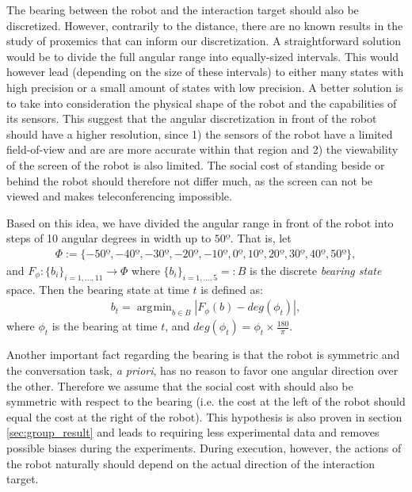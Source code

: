 \documentclass[a4paper,11pt]{report}
\DeclareMathOperator*{\argmin}{\arg\!\min}
\begin{document}
The bearing between the robot and the interaction target should also be discretized. However, contrarily to the distance, there are no known results in the study of proxemics that can inform our discretization. A straightforward solution would be to divide the full angular range into equally-sized intervals. This would however lead (depending on the size of these intervals) to either many states with high precision or a small amount of states with low precision. A better solution is to take into consideration the physical shape of the robot and the capabilities of its sensors. This suggest that the angular discretization in front of the robot should have a higher resolution, since 1) the sensors of the robot have a limited field-of-view and are are more accurate within that region and 2) the viewability of the screen of the robot is also limited. The social cost of standing beside or behind the robot should therefore not differ much, as the screen can not be viewed and makes teleconferencing impossible.

Based on this idea, we have divided the angular range in front of the robot into steps of 10 angular degrees in width up to $50º$. That is, let
\begin{align*}
  \Phi:=\{-50º,-40º,-30º,-20º,-10º,0º,10º,20º,30º,40º,50º\},
\end{align*}
and $F_\phi:\{b_i\}_{i=1,\ldots,11}\rightarrow \Phi$ where $\{b_i\}_{i=1,\ldots,5}=:B$ is the discrete \emph{bearing state} space. Then the bearing state at time $t$ is defined as:
\begin{align*}
  b_t = \argmin_{b\in B}|F_\phi(b) - deg(\phi_t)|,
\end{align*}
where $\phi_t$ is the bearing at time $t$, and $deg(\phi_t)=\phi_t\times\frac{180}{\pi}$.

Another important fact regarding the bearing is that the robot is symmetric and the conversation task, \emph{a priori}, has no reason to favor one angular direction over the other. Therefore we assume that the social cost with should also be symmetric with respect to the bearing (i.e. the cost at the left of the robot should equal the cost at the right of the robot). This hypothesis is also proven in section \ref{sec:group_result} and leads to requiring less experimental data and removes possible biases during the experiments. During execution, however, the actions of the robot naturally should depend on the actual direction of the interaction target.
\end{document}

